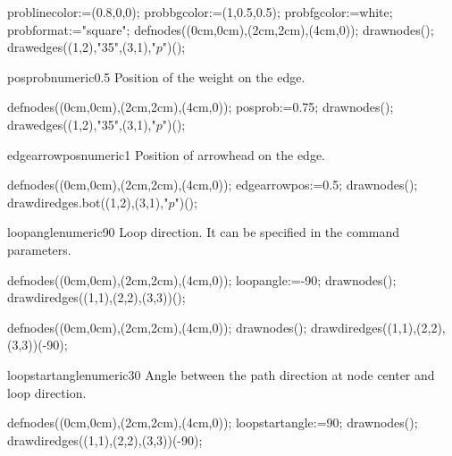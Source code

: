 \documentclass[11pt,a4paper,english]{article}
\begin{document}
\begin{exemple}[lefthand ratio = 0.6]
problinecolor:=(0.8,0,0);
probbgcolor:=(1,0.5,0.5);
probfgcolor:=white;
probformat:="square";
defnodes((0cm,0cm),(2cm,2cm),(4cm,0));
drawnodes();
drawedges((1,2),"35",(3,1),"$p$")();
\end{exemple}

\begin{mptparam}{posprob}{numeric}{0.5}
Position of the weight on the edge.
\end{mptparam}

\begin{exemple}[lefthand ratio = 0.6]
defnodes((0cm,0cm),(2cm,2cm),(4cm,0));
posprob:=0.75;
drawnodes();
drawedges((1,2),"35",(3,1),"$p$")();
\end{exemple}

\begin{mptparam}{edgearrowpos}{numeric}{1}
Position of  arrowhead on the edge.
\end{mptparam}

\begin{exemple}[lefthand ratio = 0.6]
defnodes((0cm,0cm),(2cm,2cm),(4cm,0));
edgearrowpos:=0.5;
drawnodes();
drawdiredges.bot((1,2),(3,1),"$p$")();
\end{exemple}

\begin{mptparam}{loopangle}{numeric}{90}
Loop direction. It can be specified in the command parameters.
\end{mptparam}

\begin{exemple}[lefthand ratio = 0.6]
defnodes((0cm,0cm),(2cm,2cm),(4cm,0));
loopangle:=-90;
drawnodes();
drawdiredges((1,1),(2,2),(3,3))();
\end{exemple}

\begin{exemple}[lefthand ratio = 0.6]
defnodes((0cm,0cm),(2cm,2cm),(4cm,0));
drawnodes();
drawdiredges((1,1),(2,2),(3,3))(-90);
\end{exemple}

\begin{mptparam}{loopstartangle}{numeric}{30}
Angle between the path direction at node center and loop direction.
\end{mptparam}

\begin{exemple}[lefthand ratio = 0.6]
defnodes((0cm,0cm),(2cm,2cm),(4cm,0));
loopstartangle:=90;
drawnodes();
drawdiredges((1,1),(2,2),(3,3))(-90);
\end{exemple}
\end{document}
